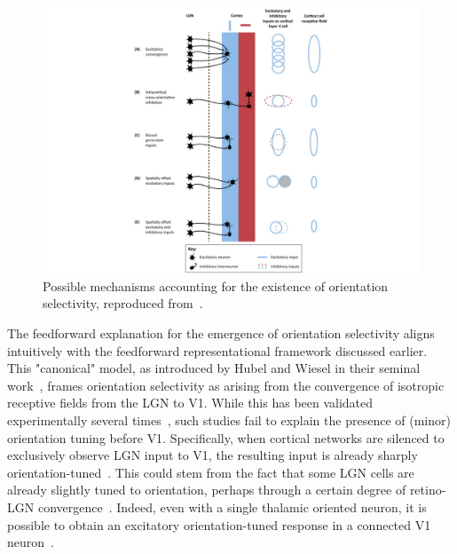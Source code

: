 \begin{figure}[h!tbp]
\vspace{0.1cm}
\centering
\includegraphics[width=.8\textwidth]{fig/chap4_vidyasagar.pdf}
\caption[Possible mechanisms for orientation selectivity.]{Possible mechanisms accounting for the existence of orientation selectivity, reproduced from~\cite{vidyasagar2015origins}.}
\label{fig_chap4_vidyasagar}
\end{figure}

The feedforward explanation for the emergence of orientation selectivity aligns intuitively with the feedforward representational framework discussed earlier. This "canonical" model, as introduced by Hubel and Wiesel in their seminal work~\cite{hubel1962receptive}, frames orientation selectivity as arising from the convergence of isotropic receptive fields from the \gls{LGN} to \gls{V1}. While this has been validated experimentally several times~\cite{ferster1986orientation, chapman1991relation}, such studies fail to explain the presence of (minor) orientation tuning before \gls{V1}. Specifically, when cortical networks are silenced to exclusively observe \gls{LGN} input to \gls{V1}, the resulting input is already sharply orientation-tuned~\cite{ferster1996orientation}. 
This could stem from the fact that some \gls{LGN} cells are already slightly tuned to orientation, perhaps through a certain degree of retino-\gls{LGN} convergence~\cite{xu2002primate,tan2011orientation,van2013transformation}. Indeed, even with a single thalamic oriented neuron, it is possible to obtain an excitatory orientation-tuned response in a connected \gls{V1} neuron~\cite{kara2002spatial}. 

